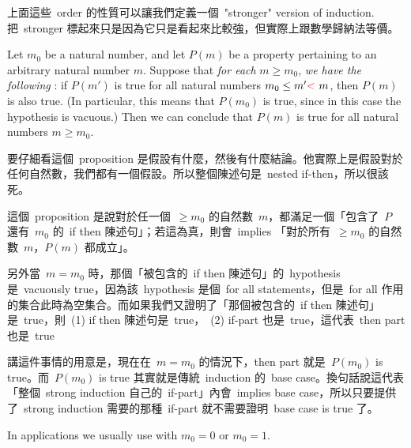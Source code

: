 \begin{note}
上面這些\ order 的性質可以讓我們定義一個\ "stronger" version of induction. 把\ stronger 標起來只是因為它只是看起來比較強，但實際上跟數學歸納法等價。
\end{note}

\begin{proposition} \label{prop 2.2.14}
Let \(m_0\) be a natural number, and let \(P(m)\) be a property pertaining to an arbitrary natural number \(m\). Suppose that \emph{for each} \(m \geq m_0\), \emph{we have the following } : if \(P(m')\) is true for all natural numbers \(m_0 \leq m' \RED{<}\ m\), then \(P(m)\) is also true. (In particular, this means that \(P(m_0)\) is true, since in this case the hypothesis is vacuous.) Then we can conclude that \(P(m)\) is true for all natural numbers \(m \geq m_0\).
\end{proposition}
\begin{note}
要仔細看這個\ proposition 是假設有什麼，然後有什麼結論。他實際上是假設對於任何自然數，我們都有一個假設。所以整個陳述句是\ nested if-then，所以很該死。

這個\ proposition 是說對於任一個\ \(\geq m_0\) 的自然數\ \(m\)，都滿足一個「包含了\ \(P\) 還有\ \(m_0\) 的\ if then 陳述句」；若這為真，則會\ implies 「對於所有\ \(\geq m_0\) 的自然數\ 
\(m\)，\(P(m)\) 都成立」。

另外當\ \(m = m_0\) 時，那個「被包含的\ if then 陳述句」的\ hypothesis 是\ vacuously true，因為該\ hypothesis 是個\ for all statements，但是\ for all 作用的集合此時為空集合。而如果我們又證明了「那個被包含的\ if then 陳述句」是\ true，則\ (1) if then 陳述句是\ true，\ (2) if-part 也是\ true，這代表\ then part 也是\ true

講這件事情的用意是，現在在\ \(m = m_0\) 的情況下，then part 就是\ \(P(m_0)\) is true。而\ \(P(m_0)\) is true 其實就是傳統\ induction 的\ base case。換句話說這代表「整個\ strong induction 自己的\ if-part」內會\ implies base case，所以只要提供了\ strong induction 需要的那種\ if-part 就不需要證明\ base case is true 了。
\end{note}

\begin{remark}\label{remark 2.2.15}
In applications we usually use  with \(m_0 = 0\) or \(m_0 = 1\).
\end{remark}

